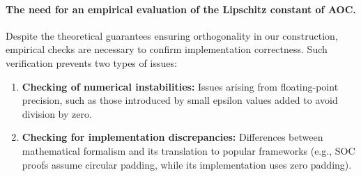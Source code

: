     \paragraph{The need for an empirical evaluation of the Lipschitz constant of AOC.}

    Despite the theoretical guarantees ensuring orthogonality in our construction, empirical checks are necessary to confirm implementation correctness. Such verification prevents two types of issues:
    \begin{enumerate}
        \item \textbf{Checking of numerical instabilities:} Issues arising from floating-point precision, such as those introduced by small epsilon values added to avoid division by zero.
        \item \textbf{Checking for implementation discrepancies:} Differences between mathematical formalism and its translation to popular frameworks (e.g., SOC proofs assume circular padding, while its implementation uses zero padding).
    \end{enumerate}




